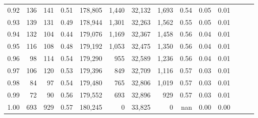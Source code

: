 \begin{tabular}{rrrrrrrrrrrrrr}
0.92 &    136 &  141 &  0.51 &  178,805 &    1,440 &  32,132 &   1,693 &  0.54 &  0.05 &      0.01 \\
0.93 &    139 &  131 &  0.49 &  178,944 &    1,301 &  32,263 &   1,562 &  0.55 &  0.05 &      0.01 \\
0.94 &    132 &  104 &  0.44 &  179,076 &    1,169 &  32,367 &   1,458 &  0.56 &  0.04 &      0.01 \\
0.95 &    116 &  108 &  0.48 &  179,192 &    1,053 &  32,475 &   1,350 &  0.56 &  0.04 &      0.01 \\
0.96 &     98 &  114 &  0.54 &  179,290 &      955 &  32,589 &   1,236 &  0.56 &  0.04 &      0.01 \\
0.97 &    106 &  120 &  0.53 &  179,396 &      849 &  32,709 &   1,116 &  0.57 &  0.03 &      0.01 \\
0.98 &     84 &   97 &  0.54 &  179,480 &      765 &  32,806 &   1,019 &  0.57 &  0.03 &      0.01 \\
0.99 &     72 &   90 &  0.56 &  179,552 &      693 &  32,896 &     929 &  0.57 &  0.03 &      0.01 \\
1.00 &    693 &  929 &  0.57 &  180,245 &        0 &  33,825 &       0 &   nan &  0.00 &      0.00 \\
\bottomrule
\end{tabular}
